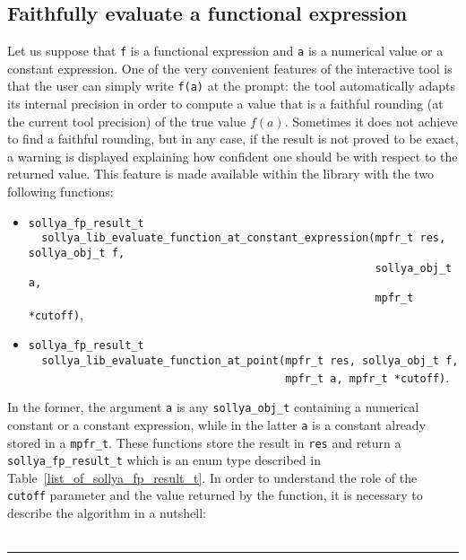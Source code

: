 \documentclass[a4paper]{article}
\begin{document}
\subsection{Faithfully evaluate a functional expression}
Let us suppose that \verb|f| is a functional expression and \verb|a| is a numerical value or a constant expression. One of the very convenient features of the interactive tool is that the user can simply write \verb|f(a)| at the prompt: the tool automatically adapts its internal precision in order to compute a value that is a faithful rounding (at the current tool precision) of the true value $f(a)$. Sometimes it does not achieve to find a faithful rounding, but in any case, if the result is not proved to be exact, a warning is displayed explaining how confident one should be with respect to the returned value. This feature is made available within the library with the two following functions:
\begin{itemize}
\item \verb|sollya_fp_result_t|\\
      \verb|  sollya_lib_evaluate_function_at_constant_expression(mpfr_t res, sollya_obj_t f,|\\
      \verb|                                                      sollya_obj_t a,|\\
      \verb|                                                      mpfr_t *cutoff)|,
\item \verb|sollya_fp_result_t|\\
      \verb|  sollya_lib_evaluate_function_at_point(mpfr_t res, sollya_obj_t f,|\\
      \verb|                                        mpfr_t a, mpfr_t *cutoff)|.
\end{itemize}
In the former, the argument \verb|a| is any \verb|sollya_obj_t| containing a numerical constant or a constant expression, while in the latter \verb|a| is a constant already stored in a \verb|mpfr_t|. These functions store the result in \verb|res| and return a \verb|sollya_fp_result_t| which is an enum type described in Table~\ref{list_of_sollya_fp_result_t}. In order to understand the role of the \verb|cutoff| parameter and the value returned by the function, it is necessary to describe the algorithm in a nutshell:\\~\\
\rule{\textwidth}{0.5px}
\end{document}
